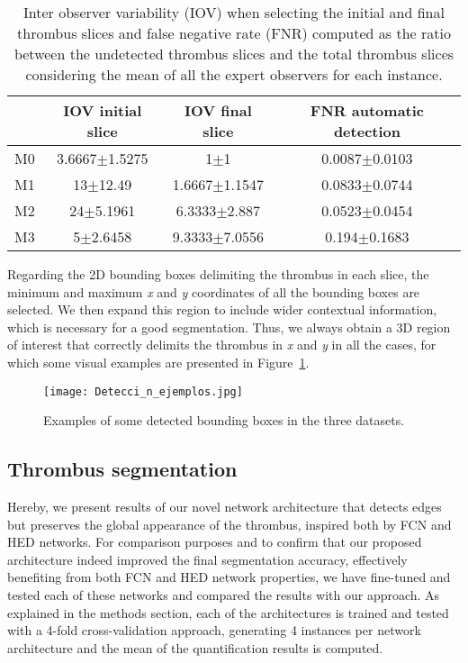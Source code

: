 \documentclass[preprint,authoryear,12pt]{elsarticle}
\begin{document}
\begin{table}[htbp]
\centering
\begin{tabular}{c|c|c|c}
\hline{} & {IOV initial slice} & {IOV final slice} & {FNR automatic detection}\\
\hline{M0} & {3.6667\(\pm\)1.5275} &  {1\(\pm\)1} & {0.0087\(\pm\)0.0103} \\
{M1} & {13\(\pm\)12.49} &  {1.6667\(\pm\)1.1547} & {0.0833\(\pm\)0.0744} \\
{M2} & {24\(\pm\)5.1961} &  {6.3333\(\pm\)2.887} & {0.0523\(\pm\)0.0454} \\
{M3} & {5\(\pm\)2.6458} &  {9.3333\(\pm\)7.0556} & {0.194\(\pm\)0.1683} \\
\end{tabular}
\caption{\label{tab:detect fn}Inter observer variability (IOV) when selecting the initial and final thrombus slices and false negative rate (FNR) computed as the ratio between the undetected thrombus slices and the total thrombus slices considering the mean of all the expert observers for each instance.}
\end{table}

Regarding the 2D bounding boxes delimiting the thrombus in each slice, the minimum and maximum \textit{x} and \textit{y} coordinates of all the bounding boxes are selected. We then expand this region to include wider contextual information, which is necessary for a good segmentation. Thus, we always obtain a 3D region of interest that correctly delimits the thrombus in \textit{x} and \textit{y} in all the cases, for which some visual examples are presented in Figure~\ref{fig:det_res}.

\begin{figure}[htb]
\centering
\texttt{[image: Detecci\_n\_ejemplos.jpg]}
\caption{\label{fig:det_res} Examples of some detected bounding boxes in the three datasets.}
\end{figure}



\subsection{Thrombus segmentation}
Hereby, we present results of our novel network architecture that detects edges but preserves the global appearance of the thrombus, inspired both by FCN and HED networks. For comparison purposes and to confirm that our proposed architecture indeed improved the final segmentation accuracy, effectively benefiting from both FCN and HED network properties, we have fine-tuned and tested each of these networks and compared the results with our approach. As explained in the methods section, each of the architectures is trained and tested with a 4-fold cross-validation approach, generating 4 instances per network architecture and the mean of the quantification results is computed.\par 
\end{document}
